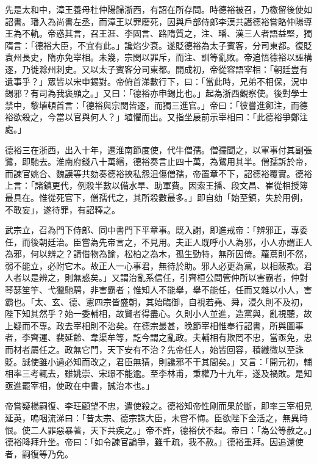 \begin{pinyinscope}
 先是太和中，漳王養母杜仲陽歸浙西，有詔在所存問。時德裕被召，乃檄留後使如詔書。璠入為尚書左丞，而漳王以罪廢死，因與戶部侍郎李漢共譖德裕嘗賂仲陽導王為不軌。帝惑其言，召王涯、李固言、路隋質之，注、璠、漢三人者語益堅，獨隋言：「德裕大臣，不宜有此。」讒焰少衰。遂貶德裕為太子賓客，分司東都。復貶袁州長史，隋亦免宰相。未幾，宗閔以罪斥，而注、訓等亂敗。帝追悟德裕以誣構逐，乃徙滁州刺史。又以太子賓客分司東都。開成初，帝從容語宰相：「朝廷豈有遺事乎？」眾皆以宋申錫對。帝俯首涕數行下，曰：「當此時，兄弟不相保，況申錫邪？有司為我褒顯之。」又曰：「德裕亦申錫比也。」起為浙西觀察使。後對學士禁中，黎埴頓首言：「德裕與宗閔皆逐，而獨三進官。」帝曰：「彼嘗進鄭注，而德裕欲殺之，今當以官與何人？」埴懼而出。又指坐扆前示宰相曰：「此德裕爭鄭注處。」



 德裕三在浙西，出入十年，遷淮南節度使，代牛僧孺。僧孺聞之，以軍事付其副張鷺，即馳去。淮南府錢八十萬緡，德裕奏言止四十萬，為鷺用其半。僧孺訴於帝，而諫官姚合、魏謨等共劾奏德裕挾私怨沮傷僧孺，帝置章不下，詔德裕覆實。德裕上言：「諸鎮更代，例殺半數以備水旱、助軍費。因索王播、段文昌、崔從相授簿最具在。惟從死官下，僧孺代之，其所殺數最多。」即自劾「始至鎮，失於用例，不敢妄」，遂待罪，有詔釋之。



 武宗立，召為門下侍郎、同中書門下平章事。既入謝，即進戒帝：「辨邪正，專委任，而後朝廷治。臣嘗為先帝言之，不見用。夫正人既呼小人為邪，小人亦謂正人為邪，何以辨之？請借物為諭，松柏之為木，孤生勁特，無所因倚。蘿蔦則不然，弱不能立，必附它木。故正人一心事君，無待於助。邪人必更為黨，以相蔽欺。君人者以是辨之，則無惑矣。」又謂治亂系信任，引齊桓公問管仲所以害霸者，仲對琴瑟笙竽、弋獵馳騁，非害霸者；惟知人不能舉，舉不能任，任而又雜以小人，害霸也。「太、玄、德、憲四宗皆盛朝，其始臨御，自視若堯、舜，浸久則不及初，陛下知其然乎？始一委輔相，故賢者得盡心。久則小人並進，造黨與，亂視聽，故上疑而不專。政去宰相則不治矣。在德宗最甚，晚節宰相惟奉行詔書，所與圖事者，李齊運、裴延齡、韋渠牟等，訖今謂之亂政。夫輔相有欺罔不忠，當亟免，忠而材者屬任之。政無它門，天下安有不治？先帝任人，始皆回容，積纖微以至誅貶。誠使雖小過必知而改之，君臣無猜，則讒邪不干其間矣。」又言：「開元初，輔相率三考輒去，雖姚崇、宋璟不能逾。至李林甫，秉權乃十九年，遂及禍敗。是知亟進罷宰相，使政在中書，誠治本也。」



 帝嘗疑楊嗣復、李玨顧望不忠，遣使殺之。德裕知帝性剛而果於斷，即率三宰相見延英，嗚咽流涕曰：「昔太宗、德宗誅大臣，未嘗不悔。臣欲陛下全活之，無異時恨。使二人罪惡暴著，天下共疾之。」帝不許，德裕伏不起。帝曰：「為公等赦之。」德裕降拜升坐。帝曰：「如令諫官論爭，雖千疏，我不赦。」德裕重拜。因追還使者，嗣復等乃免。




\end{pinyinscope}
